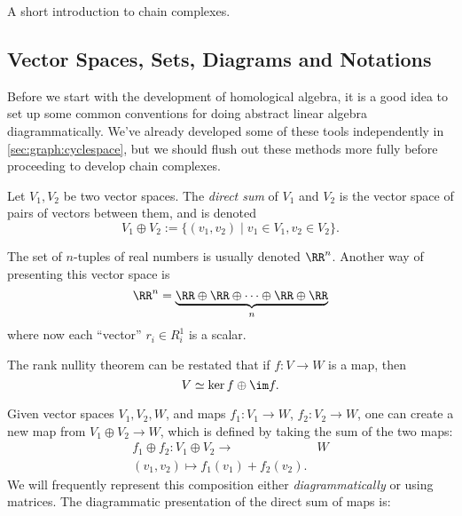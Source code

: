 
\cleartoverso 
{}
\label{chap:homologicalalgebra}

\begin{elevator}
	A short introduction to chain complexes.
\end{elevator}

\label{sec:chaincomplexes:intro}
\subsection{Vector Spaces, Sets, Diagrams and Notations}
Before we start with the development of homological algebra, it is a good idea to set up some common conventions for doing abstract linear algebra diagrammatically. We've already developed some of these tools independently in \ref{sec:graph:cyclespace}, but we should flush out these methods more fully before proceeding to develop chain complexes. \\
\begin{definition}
Let $V_1, V_2$ be two vector spaces. The \emph{direct sum} of $V_1$ and $V_2$ is the vector space of pairs of vectors between them, and is denoted 
\[V_1\oplus V_2:=\{(v_1, v_2)\;|\; v_1\in V_1, v_2\in V_2\}.\]
\end{definition}
\begin{example}
The set of $n$-tuples of real numbers is usually denoted $\RR^n$. Another way of presenting this vector space is 
\[\RR^n=\underbrace{\RR\oplus \RR \oplus \cdots \oplus \RR\oplus \RR}_n\]
where now each ``vector'' $r_i\in R^1_i$ is a scalar. 
\end{example}
\begin{example}The rank nullity theorem can be restated that if $f: V\to W$ is a map, then 
\[V\simeq \ker f\oplus \im f. \]
\end{example}
Given vector spaces $V_1, V_2, W$, and maps $f_1: V_1\to W$, $f_2: V_2\to W$, one can create a new map from $V_1\oplus V_2\to W$, which is defined by taking the sum of the two maps:
\begin{align*}
f_1\oplus f_2: V_1\oplus V_2 \to&  W\\
(v_1, v_2)\mapsto f_1(v_1)+f_2(v_2).
\end{align*}
We will frequently represent this composition either \emph{diagrammatically} or {using matrices.} The diagrammatic presentation of the direct sum of maps is:
